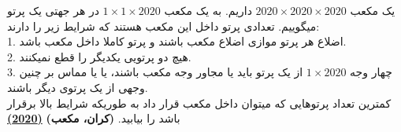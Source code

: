 یک مکعب $2020 \times 2020 \times 2020$ داریم. به یک مکعب $1 \times 1 \times 2020$ در هر جهتی
یک پرتو میگوییم.
تعدادی پرتو داخل این مکعب هستند که شرایط زیر را دارند: \\
1. اضلاع هر پرتو موازی اضلاع مکعب باشند و پرتو کاملا داخل مکعب باشد. \\
2. هیچ دو پرتویی یکدیگر را قطع نمیکنند. \\
3. چهار وجه $1 \times 2020$ از یک پرتو باید یا مجاور وجه مکعب باشند، یا یا مماس بر چنین وجهی از یک پرتوی دیگر باشند. \\
کمترین تعداد پرتوهایی که میتوان داخل مکعب قرار داد به طوریکه شرایط بالا برقرار باشد را بیابید.
\textbf{(کران، مکعب)}
\href{https://artofproblemsolving.com/community/c5h2156978p15952773}{\textbf{(2020)}}